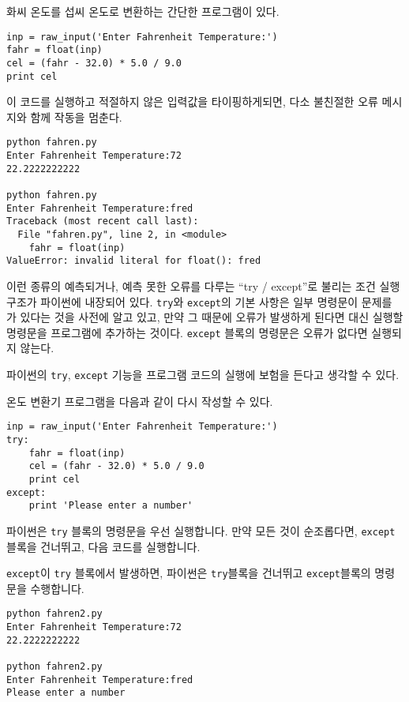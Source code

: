 화씨 온도를 섭씨 온도로 변환하는 간단한 프로그램이 있다.


\beforeverb
\begin{verbatim}
inp = raw_input('Enter Fahrenheit Temperature:')
fahr = float(inp)
cel = (fahr - 32.0) * 5.0 / 9.0
print cel
\end{verbatim}
\afterverb
%

이 코드를 실행하고 적절하지 않은 입력값을 타이핑하게되면, 다소 불친절한 오류 메시지와 함께 작동을 멈춘다.

\beforeverb
\begin{verbatim}
python fahren.py 
Enter Fahrenheit Temperature:72
22.2222222222

python fahren.py 
Enter Fahrenheit Temperature:fred
Traceback (most recent call last):
  File "fahren.py", line 2, in <module>
    fahr = float(inp)
ValueError: invalid literal for float(): fred
\end{verbatim}
\afterverb
%

이런 종류의 예측되거나, 예측 못한 오류를 다루는 ``try / except''로 불리는 조건 실행 구조가 파이썬에 내장되어 있다.
{\tt try}와 {\tt except}의 기본 사항은 일부 명령문이 문제를 가 있다는 것을 사전에 알고 있고, 만약 그 때문에 오류가 발생하게 된다면 대신 실행할 명령문을 프로그램에 추가하는 것이다. {\tt except} 블록의 명령문은 오류가 없다면 실행되지 않는다.

파이썬의 {\tt try}, {\tt except} 기능을 프로그램 코드의 실행에 보험을 든다고 생각할 수 있다.

온도 변환기 프로그램을 다음과 같이 다시 작성할 수 있다.

\beforeverb
\begin{verbatim}
inp = raw_input('Enter Fahrenheit Temperature:')
try:
    fahr = float(inp)
    cel = (fahr - 32.0) * 5.0 / 9.0
    print cel
except:
    print 'Please enter a number'
\end{verbatim}
\afterverb
%

파이썬은 {\tt try} 블록의 명령문을 우선 실행합니다. 만약 모든 것이 순조롭다면, {\tt except} 블록을 건너뛰고, 다음 코드를 실행합니다.

{\tt except}이 {\tt try} 블록에서 발생하면, 파이썬은 {\tt try}블록을 건너뛰고 {\tt except}블록의 명령문을 수행합니다. 

\beforeverb
\begin{verbatim}
python fahren2.py 
Enter Fahrenheit Temperature:72
22.2222222222

python fahren2.py 
Enter Fahrenheit Temperature:fred
Please enter a number
\end{verbatim}
\afterverb
%

